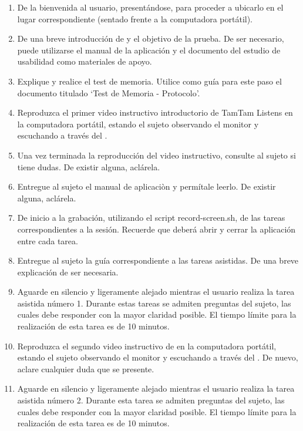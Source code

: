 \begin{enumerate}
    \item De la bienvenida al usuario, present\'andose, para proceder a ubicarlo en el lugar
    correspondiente (sentado frente a la computadora port\'atil).
    \item De una breve introducci\'on de  y el objetivo de la prueba. 
    De ser necesario, puede utilizarse el manual de la aplicaci\'on y el documento del estudio de 
    usabilidad como materiales de apoyo.
    \item Explique y realice el test de memoria. Utilice como gu\'ia para este paso el documento titulado 
    ‘Test de Memoria - Protocolo’.
    \item Reproduzca el primer video instructivo introductorio de TamTam Listens en la computadora 
    port\'atil, estando el sujeto observando el monitor y escuchando a trav\'es del .
    \item Una vez terminada la reproducci\'on del video instructivo, consulte al sujeto si tiene dudas.
    De existir alguna, acl\'arela.
    \item Entregue al sujeto el manual de aplicaciòn y perm\'itale leerlo. De existir alguna, acl\'arela.
    \item De inicio a la grabaci\'on, utilizando el script record-screen.sh, de las tareas
    correspondientes a la sesión. Recuerde que deber\'a abrir y cerrar la aplicaci\'on entre 
    cada tarea.
    \item Entregue al sujeto la gu\'ia correspondiente a las tareas asistidas. De una 
    breve explicaci\'on de ser necesaria.
    \item Aguarde en silencio y ligeramente alejado mientras el usuario realiza la tarea 
    asistida n\'umero 1. Durante estas tareas se admiten preguntas del sujeto, las cuales debe responder 
    con la mayor claridad posible. El tiempo l\'imite para la realizaci\'on de esta tarea es de 
    10 minutos.
    \item Reproduzca el segundo video instructivo de  en la computadora 
    port\'atil, estando el sujeto observando el monitor y escuchando a trav\'es del . 
    De nuevo, aclare cualquier duda que se presente.
    \item Aguarde en silencio y ligeramente alejado mientras el usuario realiza la tarea asistida 
    n\'umero 2. Durante esta tarea se admiten preguntas del sujeto, las cuales debe responder con la
    mayor claridad posible. El tiempo l\'imite para la realizaci\'on de esta tarea es de 10 minutos.

\end{enumerate}
